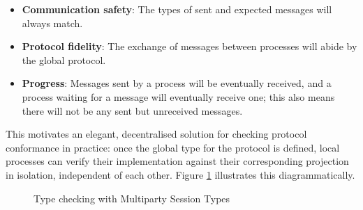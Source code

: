 \begin{itemize}
\item \textbf{Communication safety}: The types of sent and expected messages will always match.
\item \textbf{Protocol fidelity}: The exchange of messages between processes will abide by the global protocol.
\item \textbf{Progress}: Messages sent by a process will be eventually received, and a process waiting for a message will eventually receive one; this also means there will not be any sent but unreceived messages.
\end{itemize}

This motivates an elegant, decentralised solution for checking protocol conformance in practice: once the global type for the protocol is defined, local processes can verify their implementation against their corresponding projection in isolation, independent of each other. Figure \ref{fig:mpst_workflow} illustrates this diagrammatically.

\begin{figure}[!h]
\caption{Type checking with Multiparty Session Types}
\label{fig:mpst_workflow}
\end{figure}
